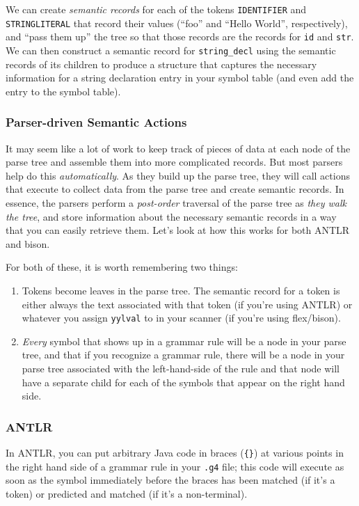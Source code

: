 \documentclass{article}
\begin{document}
We can create {\em semantic records} for each of the tokens \texttt{IDENTIFIER} and \texttt{STRINGLITERAL} that record their values (``foo'' and ``Hello World'', respectively), and ``pass them up'' the tree so that those records are the records for \texttt{id} and \texttt{str}. We can then construct a semantic record for \texttt{string\_decl} using the semantic records of its children to produce a structure that captures the necessary information for a string declaration entry in your symbol table (and even add the entry to the symbol table).

\subsubsection{Parser-driven Semantic Actions}
It may seem like a lot of work to keep track of pieces of data at each node of the parse tree and assemble them into more complicated records. But most parsers help do this {\em automatically}. 
As they build up the parse tree, they will call actions that execute to collect data from the parse tree and create semantic records. 
In essence, the parsers perform a {\em post-order} traversal of the parse tree as {\em they walk the tree}, and store information about the necessary semantic records in a way that you can easily retrieve them. 
Let's look at how this works for both ANTLR and bison.

For both of these, it is worth remembering two things:
\begin{enumerate}
	\item Tokens become leaves in the parse tree. The semantic record for a token is either always the text associated with that token (if you're using ANTLR) or whatever you assign \texttt{yylval} to in your scanner (if you're using flex/bison).
	\item {\em Every} symbol that shows up in a grammar rule will be a node in your parse tree, and that if you recognize a grammar rule, there will be a node in your parse tree associated with the left-hand-side of the rule and that node will have a separate child for each of the symbols that appear on the right hand side.
\end{enumerate}

\subsubsection{ANTLR}
In ANTLR, you can put arbitrary Java code in braces (\texttt{\{\}}) at various points in the right hand side of a grammar rule in your \texttt{.g4} file; this code will execute as soon as the symbol immediately before the braces has been matched (if it's a token) or predicted and matched (if it's a non-terminal).
\end{document}
